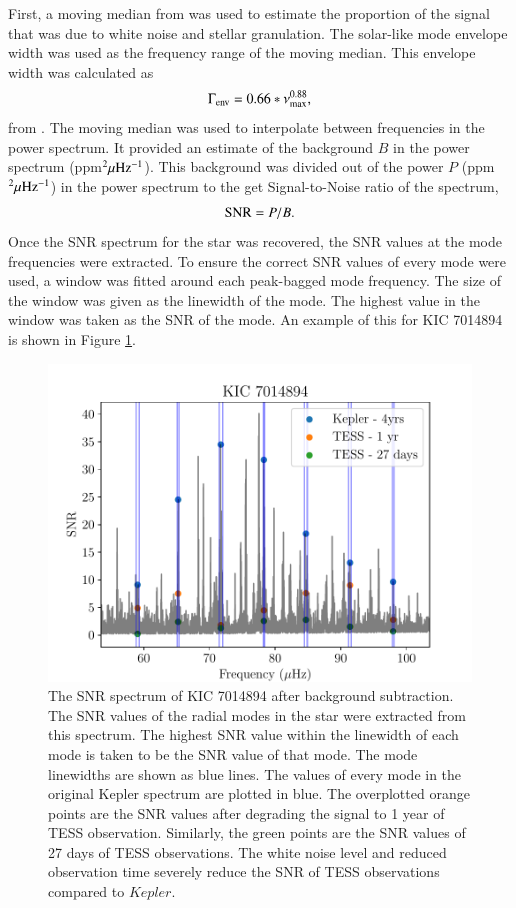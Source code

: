 \documentclass[a4paper,fleqn,usenatbib,useAMS]{mnras}
\newcommand{\numax}{\ensuremath{\nu_{\textrm{max}}}}
\newcommand{\kep}{\ensuremath{Kepler}\:}
\begin{document}
First, a moving median from \citet{davies_asteroseismology_2016} was used to estimate the proportion of the signal that was due to white noise and stellar granulation. The solar-like mode envelope width was used as the frequency range of the moving median. This envelope width was calculated as
\begin{equation}
\Gamma_{\rm env} = 0.66 * \numax^{0.88},
\end{equation}
from \citet{mosser_characterization_2012}. The moving median was used to interpolate between frequencies in the power spectrum. It provided an estimate of the background $B$ in the power spectrum (ppm$^{2} \mu\rm Hz^{-1}$). This background was divided out of the power $P$ (ppm$^{2} \mu\rm Hz^{-1}$) in the power spectrum to the get Signal-to-Noise ratio of the spectrum,
\begin{equation}
\label{eq:snr}
{\rm SNR} = P/B.
\end{equation}
Once the SNR spectrum for the star was recovered, the SNR values at the mode frequencies were extracted. To ensure the correct SNR values of every mode were used, a window was fitted around each peak-bagged mode frequency. The size of the window was given as the linewidth of the mode. The highest value in the window was taken as the SNR of the mode. An example of this for KIC 7014894 is shown in Figure \ref{snr}.
\begin{figure}
	\centering
	\includegraphics[scale=0.6]{plot4_SNR7014894.pdf}
	\caption{The SNR spectrum of KIC 7014894 after background subtraction. The SNR values of the radial modes in the star were extracted from this spectrum. The highest SNR value within the linewidth of each mode is taken to be the SNR value of that mode. The mode linewidths are shown as blue lines. The values of every mode in the original Kepler spectrum are plotted in blue. The overplotted orange points are the SNR values after degrading the signal to 1 year of TESS observation. Similarly, the green points are the SNR values of 27 days of TESS observations. The white noise level and reduced observation time severely reduce the SNR of TESS observations compared to \kep.}	
	\label{snr}
\end{figure}
\end{document}

